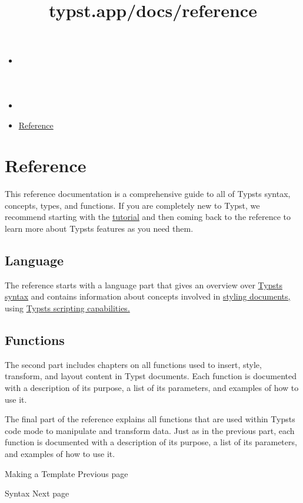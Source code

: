 \title{typst.app/docs/reference}

\begin{itemize}
\tightlist
\item
  \href{/docs}{}
\item
  
\item
  \href{/docs/reference/}{Reference}
\end{itemize}

\section{Reference}\label{reference}

This reference documentation is a comprehensive guide to all of
Typst\textquotesingle s syntax, concepts, types, and functions. If you
are completely new to Typst, we recommend starting with the
\href{/docs/tutorial/}{tutorial} and then coming back to the reference
to learn more about Typst\textquotesingle s features as you need them.

\subsection{Language}\label{language}

The reference starts with a language part that gives an overview over
\href{/docs/reference/syntax/}{Typst\textquotesingle s syntax} and
contains information about concepts involved in
\href{/docs/reference/styling/}{styling documents,} using
\href{/docs/reference/scripting/}{Typst\textquotesingle s scripting
capabilities.}

\subsection{Functions}\label{functions}

The second part includes chapters on all functions used to insert,
style, transform, and layout content in Typst documents. Each function
is documented with a description of its purpose, a list of its
parameters, and examples of how to use it.

The final part of the reference explains all functions that are used
within Typst\textquotesingle s code mode to manipulate and transform
data. Just as in the previous part, each function is documented with a
description of its purpose, a list of its parameters, and examples of
how to use it.

\href{/docs/tutorial/making-a-template/}{\pandocbounded{}}

{ Making a Template } { Previous page }

\href{/docs/reference/syntax/}{\pandocbounded{}}

{ Syntax } { Next page }
